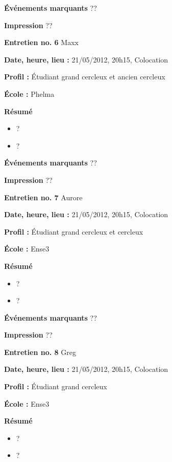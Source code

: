 \documentclass[a4paper, 11px]{article}
\begin{document}
\textbf{Événements marquants}
??

\textbf{Impression}
??



\vspace{.3cm}

 \textbf {\large Entretien no. 6}
Maxx

\textbf{Date, heure, lieu : }
21/05/2012, 20h15, Colocation

\textbf{Profil : }
Étudiant grand cercleux et ancien cercleux


\textbf{École : }
Phelma

\textbf{Résumé}
	\begin{itemize}
		\item ?
		\item ?
	\end{itemize}

\textbf{Événements marquants}
??

\textbf{Impression}
??



\vspace{.3cm}

 \textbf {\large Entretien no. 7}
Aurore

\textbf{Date, heure, lieu : }
21/05/2012, 20h15, Colocation

\textbf{Profil : }
Étudiant grand cercleux et cercleux


\textbf{École : }
Ense3

\textbf{Résumé}
	\begin{itemize}
		\item ?
		\item ?
	\end{itemize}

\textbf{Événements marquants}
??

\textbf{Impression}
??



\vspace{.3cm}

 \textbf {\large Entretien no. 8}
Greg

\textbf{Date, heure, lieu : }
21/05/2012, 20h15, Colocation

\textbf{Profil : }
Étudiant grand cercleux


\textbf{École : }
Ense3

\textbf{Résumé}
	\begin{itemize}
		\item ?
		\item ?
	\end{itemize}
\end{document}
